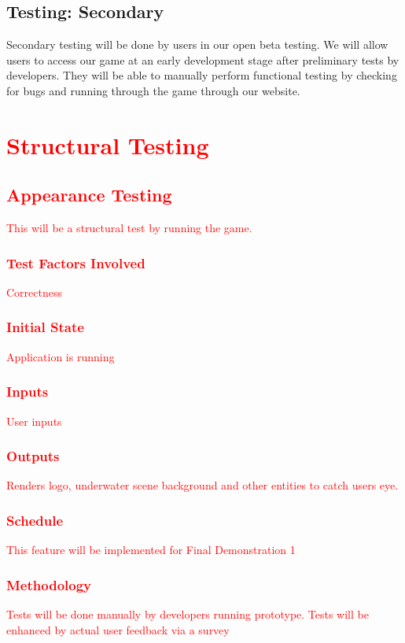\documentclass[11pt, oneside]{article}   	%
\begin{document}
\subsection{Testing: Secondary}
Secondary testing will be done by users in our open beta testing. We will allow users to access our game at an early development stage after preliminary tests by developers. They will be able to manually perform functional testing by checking for bugs and running through the game through our website. 
\newpage
\section{\textcolor{red}{Structural Testing}}

\subsection{\textcolor{red}{Appearance Testing}}
\textcolor{red}{This will be a structural test by running the game.}
\subsubsection{\textcolor{red}{Test Factors Involved}}
\textcolor{red}{Correctness}
\subsubsection{\textcolor{red}{Initial State}}
\textcolor{red}{Application is running}
\subsubsection{\textcolor{red}{Inputs}}
\textcolor{red}{User inputs}
\subsubsection{\textcolor{red}{Outputs}}
\textcolor{red}{Renders logo, underwater scene background and other entities to catch users eye. }
\subsubsection{\textcolor{red}{Schedule}}
\textcolor{red}{This feature will be implemented for Final Demonstration 1}
\subsubsection{\textcolor{red}{Methodology}}
\textcolor{red}{Tests will be done manually by developers running prototype. Tests will be enhanced by actual user feedback via a survey}
\end{document}
